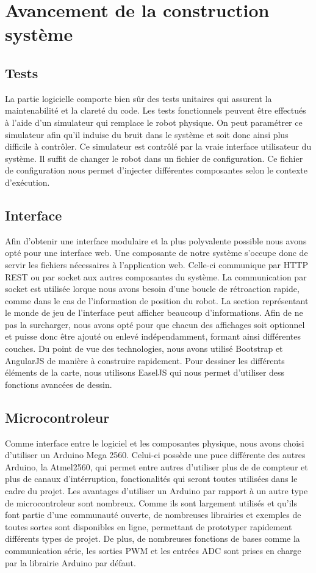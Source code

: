 \chapter{Avancement de la construction système}

\section{Tests}
La partie logicielle comporte bien sûr des tests unitaires qui assurent la maintenabilité et la clareté du code.
Les tests fonctionnels peuvent être effectués à l'aide d'un simulateur qui remplace le robot physique.
On peut paramétrer ce simulateur afin qu'il induise du bruit dans le système et soit donc ainsi plus difficile à contrôler.
Ce simulateur est contrôlé par la vraie interface utilisateur du système.
Il suffit de changer le robot dans un fichier de configuration.
Ce fichier de configuration nous permet d'injecter différentes composantes selon le contexte d'exécution.

\section{Interface}
Afin d'obtenir une interface modulaire et la plus polyvalente possible nous avons opté pour une interface web.
Une composante de notre système s'occupe donc de servir les fichiers nécessaires à l'application web.
Celle-ci communique par HTTP REST ou par socket aux autres composantes du système.
La communication par socket est utilisée lorque nous avons besoin d'une boucle de rétroaction rapide,
comme dans le cas de l'information de position du robot.
La section représentant le monde de jeu de l'interface peut afficher beaucoup d'informations.
Afin de ne pas la surcharger, nous avons opté pour que chacun des affichages soit optionnel et puisse donc
être ajouté ou enlevé indépendamment, formant ainsi différentes couches.
Du point de vue des technologies, nous avons utilisé Bootstrap et AngularJS de manière à construire rapidement.
Pour dessiner les différents éléments de la carte, nous utilisons EaselJS qui nous permet d'utiliser dess fonctions avancées de dessin.


\section{Microcontroleur}

Comme interface entre le logiciel et les composantes physique, nous avons choisi d’utiliser un Arduino Mega 2560. Celui-ci possède une puce différente des autres Arduino, la Atmel2560, qui permet entre autres d’utiliser plus de de compteur et plus de canaux d’intérruption, fonctionalités qui seront toutes utilisées dans le cadre du projet. Les avantages d’utiliser un Arduino par rapport à un autre type de microcontroleur sont nombreux. Comme ils sont largement utilisés et qu’ils font partie d’une communauté ouverte, de nombreuses librairies et exemples de toutes sortes sont disponibles en ligne, permettant de prototyper rapidement différents types de projet. De plus, de nombreuses fonctions de bases comme la communication série, les sorties PWM et les entrées ADC sont prises en charge par la librairie Arduino par défaut. 

